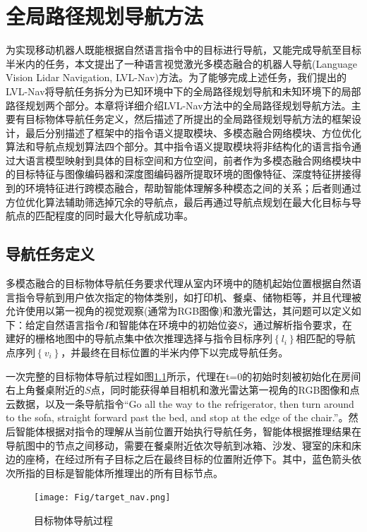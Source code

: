 
\chapter{全局路径规划导航方法}
为实现移动机器人既能根据自然语言指令中的目标进行导航，又能完成导航至目标半米内的任务，本文提出了一种语言视觉激光多模态融合的机器人导航(Language Vision Lidar Navigation, LVL-Nav)方法。为了能够完成上述任务，我们提出的LVL-Nav将导航任务拆分为已知环境中下的全局路径规划导航和未知环境下的局部路径规划两个部分。本章将详细介绍LVL-Nav方法中的全局路径规划导航方法。主要有目标物体导航任务定义，然后描述了所提出的全局路径规划导航方法的框架设计，最后分别描述了框架中的指令语义提取模块、多模态融合网络模块、方位优化算法和导航点规划算法四个部分。其中指令语义提取模块将非结构化的语言指令通过大语言模型映射到具体的目标空间和方位空间，前者作为多模态融合网络模块中的目标特征与图像编码器和深度图编码器所提取环境的图像特征、深度特征拼接得到的环境特征进行跨模态融合，帮助智能体理解多种模态之间的关系；后者则通过方位优化算法辅助筛选掉冗余的导航点，最后再通过导航点规划在最大化目标与导航点的匹配程度的同时最大化导航成功率。

\section{导航任务定义}
多模态融合的目标物体导航任务要求代理从室内环境中的随机起始位置根据自然语言指令导航到用户依次指定的物体类别，如打印机、餐桌、储物柜等，并且代理被允许使用以第一视角的视觉观察(通常为RGB图像)和激光雷达，其问题可以定义如下：给定自然语言指令$I$和智能体在环境中的初始位姿$S$，通过解析指令要求，在建好的栅格地图中的导航点集中依次推理选择与指令目标序列$\left\{ {{l_i}} \right\}$相匹配的导航点序列$\left\{ {{v_i}} \right\}$，并最终在目标位置的半米内停下以完成导航任务。

一次完整的目标物体导航过程如图\ref{simularity_world}所示，代理在t=0的初始时刻被初始化在房间右上角餐桌附近的$S$点，同时能获得单目相机和激光雷达第一视角的RGB图像和点云数据，以及一条导航指令“Go all the way to the refrigerator, then turn around to the sofa, straight forward past the bed, and stop at the edge of the chair.”。然后智能体根据对指令的理解从当前位置开始执行导航任务，智能体根据推理结果在导航图中的节点之间移动，需要在餐桌附近依次导航到冰箱、沙发、寝室的床和床边的座椅，在经过所有子目标之后在最终目标的位置附近停下。其中，蓝色箭头依次所指的目标是智能体所推理出的所有目标节点。
\begin{figure}[htbp]
    \centering
    \texttt{[image: Fig/target\_nav.png]}
    \caption{\label{simularity_world}目标物体导航过程}
\end{figure}



